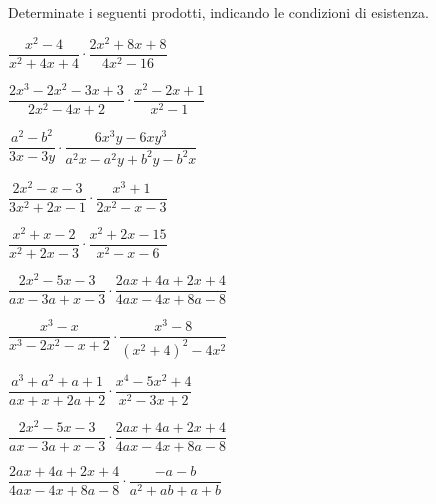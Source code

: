\begin{esercizio}
\label{ese:19.16}
Determinate i seguenti prodotti, indicando le condizioni di esistenza.
\begin{multicols}{2}
\begin{enumeratea}
 \item \(\dfrac{x^{2}-4}{x^{2}+4x+4}\cdot \dfrac{2x^{2}+8x+8}{4x^{2}-16}\)
 \item \(\dfrac{2x^{3}-2x^{2}-3x+3}{2x^{2}-4x+2}\cdot{\dfrac{x^{2}-2x+1}{x^{2}-1}}\)
 \item \(\dfrac{a^{2}-b^{2}}{3x-3y}\cdot {\dfrac{6x^{3}y-6xy^{3}}{a^{2}x-a^{2}y+b^{2}y-b^{2}x}}\)
 \item \(\dfrac{2x^{2}-x-3}{3x^{2}+2x-1}\cdot {\dfrac{x^{3}+1}{2x^{2}-x-3}}\)
 \item \(\dfrac{x^{2}+x-2}{x^{2}+2x-3}\cdot {\dfrac{x^{2}+2x-15}{x^{2}-x-6}}\)
 \item \(\dfrac{2x^{2}-5x-3}{ax-3a+x-3}\cdot {\dfrac{2ax+4a+2x+4}{4ax-4x+8a-8}}\)
 \item \(\dfrac{x^{3}-x}{x^{3}-2x^{2}-x+2}\cdot {\dfrac{x^{3}-8}{\left(x^{2}+4\right)^{2}-4x^{2}}}\)
 \item \(\dfrac{a^{3}+a^{2}+a+1}{ax+x+2a+2}\cdot {\dfrac{x^{4}-5x^{2}+4}{x^{2}-3x+2}}\)
 \item \(\dfrac{2x^{2}-5x-3}{ax-3a+x-3}\cdot {\dfrac{2ax+4a+2x+4}{4ax-4x+8a-8}}\)
 \item \(\dfrac{2ax+4a+2x+4}{4ax-4x+8a-8}\cdot {\dfrac{-a-b}{a^{2}+ab+a+b}}\)
\end{enumeratea}
\end{multicols}
\end{esercizio}

\subsubsection*{}


